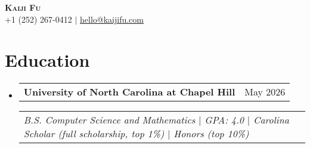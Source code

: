 \documentclass[letterpaper,11pt]{article}
\makeatletter
\newcommand{\resumeSubheading}[3]{
  \vspace{-2pt}\item
    \begin{tabular*}{0.97\textwidth}[t]{l@{\extracolsep{\fill}}r}
      \textbf{#1} & #2 \\
    \end{tabular*}
    \begin{tabular*}{0.97\textwidth}[t]{l}
      \textit{\small#3} \\
    \end{tabular*}\vspace{-7pt}
}
\newcommand{\resumeSubHeadingListStart}{\begin{itemize}[leftmargin=0.15in, label={}]}
\newcommand{\resumeSubHeadingListEnd}{\end{itemize}}
\makeatother
\begin{document}
\begin{center}
    \textbf{\Huge \scshape Kaiji Fu} \\ \vspace{4pt}
    \small +1 (252) 267-0412 $|$ \href{mailto:hello@kaijifu.com}{\underline{hello@kaijifu.com}}
\end{center}


\section{Education}
  \resumeSubHeadingListStart
    \resumeSubheading
      {University of North Carolina at Chapel Hill}{May 2026}
      {B.S. Computer Science and Mathematics $|$ GPA: 4.0 $|$ Carolina Scholar (full scholarship, top 1\%) $|$ Honors (top 10\%)}
  \resumeSubHeadingListEnd
\end{document}
